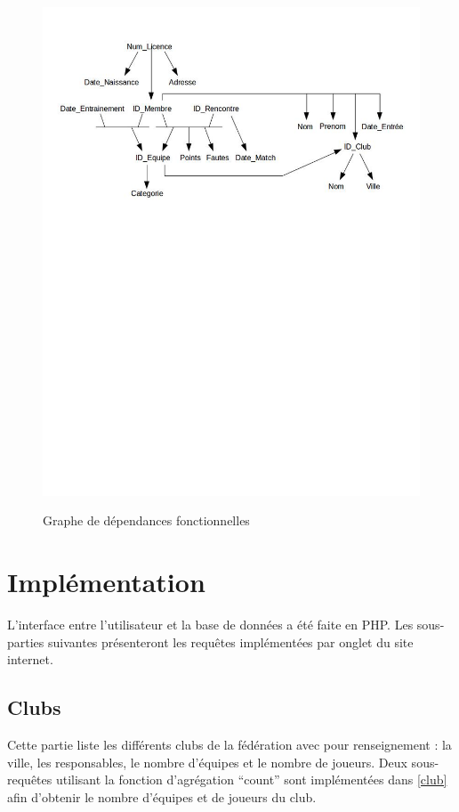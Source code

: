 \documentclass[a4paper»,8pt,french,fleqn]{report}
\begin{document}
\begin{figure}[h]
  \centering
    \includegraphics[scale=0.5]{DepFct.jpeg}
    \label{fig:depfct}
    \caption{Graphe de dépendances fonctionnelles}
\end{figure}

\chapter{Implémentation}

L'interface entre l'utilisateur et la base de données a été faite en PHP. Les sous-parties suivantes présenteront les requêtes implémentées par onglet du site internet.

\section{Clubs}

Cette partie liste les différents clubs de la fédération avec pour renseignement : la ville, les responsables, le nombre d'équipes et le nombre de joueurs. Deux sous-requêtes utilisant la fonction d'agrégation ``count'' sont implémentées dans \ref{club} afin d'obtenir le nombre d'équipes et de joueurs du club. 
\end{document}
